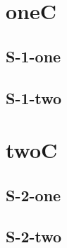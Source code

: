 \documentclass%
   [oneside]{memoir}
\begin{document}
\dominitoc
\tableofcontents*

\chapter[oneA][oneB]{oneC}
\minitoc
\lipsum[1] \newpage \lipsum[2]
\section{S-1-one} \lipsum[3]
\section{S-1-two} \lipsum[4]

\chapter[twoA][twoB]{twoC}
\minitoc
\lipsum[4] \newpage \lipsum[5]
\section{S-2-one} \lipsum[6]
\section{S-2-two} \lipsum[7]
\end{document}
